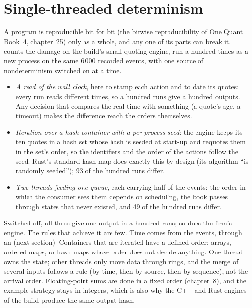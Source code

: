 \section{Single-threaded determinism}

A program is reproducible bit for bit (the bitwise reproducibility of One Quant Book~4, chapter~25) only as a whole, and any
one of its parts can break it.  counts the damage on the build's small quoting engine, run a hundred times as a new
process on the same 6\,000 recorded events, with one source of nondeterminism switched on at a time.

\begin{itemize}
\item \emph{A read of the wall clock}, here to stamp each action and to date its quotes: every run reads different times, so a
hundred runs give a hundred outputs. Any decision that compares the real time with something (a quote's age, a timeout) makes
the difference reach the orders themselves.
\item \emph{Iteration over a hash container with a per-process seed}: the engine keeps its ten quotes in a hash set whose hash
is seeded at start-up and requotes them in the set's order, so the identifiers and the order of the actions follow the seed.
Rust's standard hash map does exactly this by design (its algorithm ``is randomly seeded''); 93 of the hundred runs
differ.
\item \emph{Two threads feeding one queue}, each carrying half of the events: the order in which the consumer sees them depends
on scheduling, the book passes through states that never existed, and 49 of the hundred runs differ.
\end{itemize}

Switched off, all three give one output in a hundred runs; so does the firm's engine. The rules that achieve it are few. Time
comes from the events, through an  (next section). Containers that are iterated have a defined order: arrays,
ordered maps, or hash maps whose order does not decide anything. One thread owns the state; other threads only move data
through rings, and the merge of several inputs follows a rule (by time, then by source, then by sequence), not the arrival
order. Floating-point sums are done in a fixed order (chapter~8), and the example strategy stays in integers, which is also why
the C++ and Rust engines of the build produce the same output hash.

